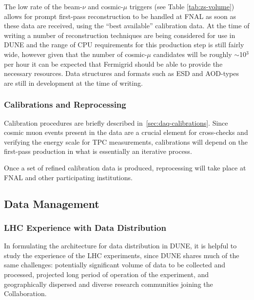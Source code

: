 The low rate of the beam-$\nu$ and cosmic-$\mu$ triggers (see Table \ref{tab:zs-volume}) allows for
prompt first-pass reconstruction to be handled at FNAL as soon as these data are received, using the
``best available'' calibration data. At the time of writing
a number of reconstruction techniques are being considered for use in DUNE and the range of CPU requirements
for this production step is still fairly wide, however given that the number of cosmic-$\mu$ candidates will be roughly $\sim$10$^3$ per hour
it can be expected that Fermigrid should be able to provide the necessary resources. 
Data structures and formats such as ESD and AOD-types are still in development at the time of writing.

\subsubsection{Calibrations and Reprocessing}
Calibration procedures are briefly described in~\ref{sec:daq-calibrations}. Since cosmic muon events present in the data
are a crucial element for cross-checks and verifying the energy scale for TPC measurements, calibrations will depend on
the first-pass production in what is essentially an iterative process.

Once a set of  refined calibration data is produced, reprocessing will take place at FNAL and other participating institutions.

\subsection{Data Management}
\subsubsection{LHC Experience with Data Distribution}

In formulating the architecture for data distribution in DUNE, it is helpful to study the experience of the LHC experiments,
since DUNE shares much of the same challenges: potentially significant  volume of data to be collected and processed,
projected long period of operation of the experiment, and geographically dispersed and diverse research communities joining the Collaboration.

